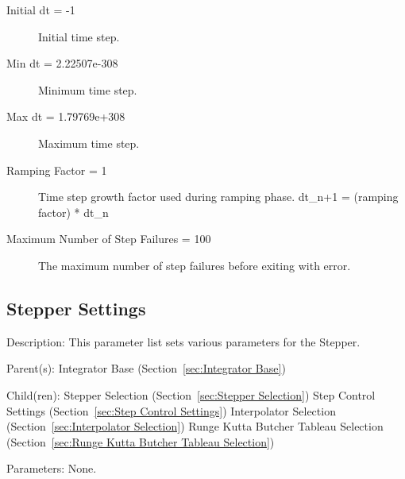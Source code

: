 \begin{list}{}
\begin{description}
      \item[Initial dt = -1] 
Initial time step.
      \item[Min dt = 2.22507e-308] 
Minimum time step.
      \item[Max dt = 1.79769e+308] 
Maximum time step.
      \item[Ramping Factor = 1] 
Time step growth factor used during ramping phase. dt\_{n+1} = (ramping factor) * dt\_n
      \item[Maximum Number of Step Failures = 100] 
The maximum number of step failures before exiting with error.
\end{description}

\end{list}

\subsection{Stepper Settings}
\label{sec:Stepper Settings}

\begin{list}{}
  {\setlength{\leftmargin}{1.0in}
   \setlength{\labelwidth}{0.75in}
   \setlength{\labelsep}{0.125in}}
  \item[Description:]
    This parameter list sets various parameters for the Stepper.
  \item[Parent(s):]
    Integrator Base (Section~\ref{sec:Integrator Base})
  \item[Child(ren):]
    Stepper Selection (Section~\ref{sec:Stepper Selection})
      \newline 
    Step Control Settings (Section~\ref{sec:Step Control Settings})
      \newline 
    Interpolator Selection (Section~\ref{sec:Interpolator Selection})
      \newline 
    Runge Kutta Butcher Tableau Selection (Section~\ref{sec:Runge Kutta Butcher Tableau Selection})
  \item[Parameters:]
    None. 
\end{list}

